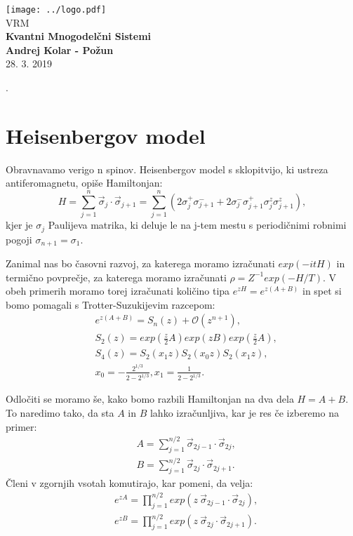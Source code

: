 \documentclass{article}
\begin{document}
\begin{titlepage}
    \begin{center}
        \vspace*{1cm}
        \Large
\texttt{[image: ../logo.pdf]}\\
        \Large
\vspace{1cm}
        VRM\\
        \huge
        \textbf{Kvantni Mnogodelčni Sistemi\\}
\Large  
        \vspace{1cm}
        \textbf{Andrej Kolar - Po{\v z}un\\}
        \vspace{0.8cm}
 28. 3. 2019

\vfill
\normalsize
\end{center}. 
\end{titlepage}
\newpage
{}
\section*{Heisenbergov model}
Obravnavamo verigo n spinov. Heisenbergov model s sklopitvijo, ki ustreza antiferomagnetu, opiše Hamiltonjan:
\begin{equation*}
H = \sum_{j=1}^n \vec{\sigma}_j \cdot \vec{\sigma}_{j+1} = \sum_{j=1}^n (2\sigma_j^+ \sigma_{j+1}^- + 2 \sigma_j^- \sigma_{j+1}^+ \sigma_j^z \sigma_{j+1}^z),
\end{equation*}
kjer je $\sigma_j$ Paulijeva matrika, ki deluje le na j-tem mestu s periodičnimi robnimi pogoji $\sigma_{n+1}=\sigma_1$.

Zanimal nas bo časovni razvoj, za katerega moramo izračunati $exp(-it H)$ in termično povprečje, za  katerega moramo izračunati $\rho = Z^{-1} exp(-H/T)$.
V obeh primerih moramo torej izračunati količino tipa $e^{zH}=e^{z(A+B)}$ in spet si bomo pomagali s Trotter-Suzukijevim razcepom:
\begin{align*}
&e^{z(A+B)} = S_n(z) + \mathcal{O}(z^{n+1}), \\
& S_2(z) = exp \left( \frac{z}{2}A \right) exp(z B) exp \left( \frac{z}{2}A \right), \\
& S_4(z) = S_2(x_1 z) S_2 (x_0 z) S_2( x_1 z), \\
&x_0 = -\frac{2^{1/3}}{2-2^{1/3}}, x_1 = \frac{1}{2 - 2^{1/3}}.
\end{align*}

Odločiti se moramo še, kako bomo razbili Hamiltonjan na dva dela $H=A+B$. To naredimo tako, da sta $A$ in $B$ lahko izračunljiva, kar je res če izberemo na primer:
\begin{align*}
&A=\sum_{j=1}^{n/2} \vec{\sigma}_{2j-1} \cdot \vec{\sigma}_{2j}, \\
&B=\sum_{j=1}^{n/2} \vec{\sigma}_{2j} \cdot \vec{\sigma}_{2j+1}. 
\end{align*}
Členi v zgornjih vsotah komutirajo, kar pomeni, da velja:
\begin{align*}
&e^{zA}=\prod_{j=1}^{n/2} exp(z\  \vec{\sigma}_{2j-1} \cdot \vec{\sigma}_{2j}), \\
&e^{zB}=\prod_{j=1}^{n/2} exp(z\  \vec{\sigma}_{2j} \cdot \vec{\sigma}_{2j+1}). 
\end{align*}
\end{document}
